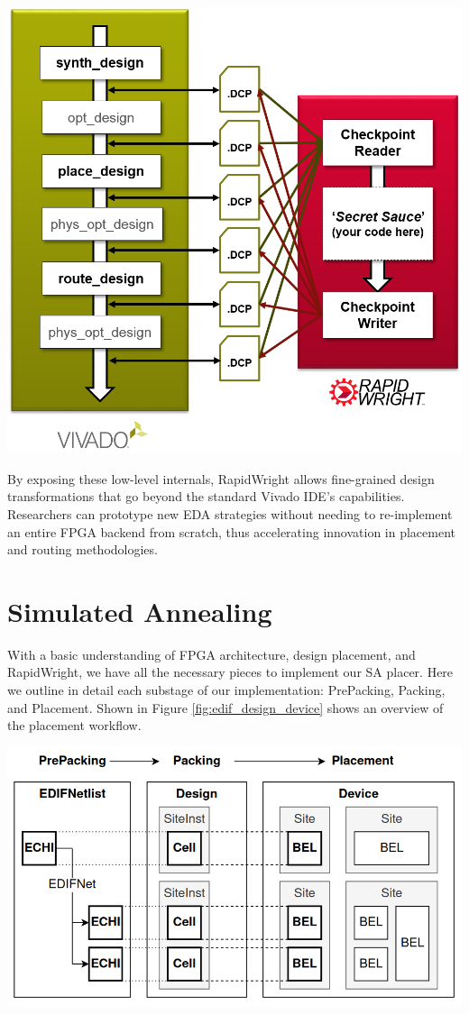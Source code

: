 \documentclass{article}
\begin{document}
\begin{multicols}{2}
    {
        \centering
        \includegraphics[width=0.8\columnwidth]{figures/vivado_dcps.png}
        \label{fig:vivado_dcps}
    }

    By exposing these low-level internals, RapidWright allows fine-grained design transformations that go beyond the standard Vivado IDE’s capabilities. 
    Researchers can prototype new EDA strategies without needing to re-implement an entire FPGA backend from scratch, thus accelerating innovation in placement and routing methodologies.

\section{Simulated Annealing}
    \label{sec:simulated_annealing}
    With a basic understanding of FPGA architecture, design placement, and RapidWright, we have all the necessary pieces to implement our SA placer. 
    Here we outline in detail each substage of our implementation: PrePacking, Packing, and Placement. 
    Shown in Figure \ref{fig:edif_design_device} shows an overview of the placement workflow. 

    {
        \centering
        \includegraphics[width=0.9\columnwidth]{figures/edif_design_device.png}
        \label{fig:edif_design_device}
    }

    \end{multicols}
\end{document}
